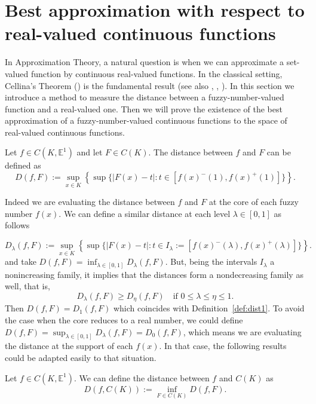 \documentclass[12pt]{amsart}
\begin{document}
\section{Best approximation with respect to real-valued continuous functions}

In Approximation Theory, a natural question is when we can approximate a set-valued function by continuous real-valued functions. In the classical setting, Cellina's Theorem (\cite{cellina}) is the fundamental result (see also \cite{Beer}, \cite{blasi}, \cite{hola}).  In this section we introduce a method to measure the distance between a fuzzy-number-valued function and a real-valued one. Then we will prove the existence of the best approximation of a fuzzy-number-valued continuous functions to the space of real-valued continuous functions.

\begin{definition}\label{def:dist1}
Let $f \in C(K,\mathbb{E}^1)$ and let $F\in C(K)$. The distance between $f$ and $F$ can be defined as
\[D(f,F):=\sup_{x\in K}\left\{\sup\{|F(x)-t|:t\in [f(x)^-(1),f(x)^+(1)]\}\right\}.\]
\end{definition}

\begin{remark}
Indeed we are evaluating the distance between $f$ and $F$ at the core of each fuzzy number $f(x)$. We can define a similar distance at each level $\lambda\in[0,1]$ as follows

\[
D_{\lambda}(f,F):=\sup_{x\in K}\left\{\sup\{|F(x)-t|:t\in I_{\lambda}:=[f(x)^-(\lambda),f(x)^+(\lambda)]\}\right\}.
\]
and take $D(f,F)=\inf_{\lambda\in[0,1]}D_{\lambda}(f,F)$.
But, being the intervals $I_\lambda$ a nonincreasing family, it implies that the distances form a nondecreasing family as well, that is,
\[
D_{\lambda}(f,F)\geq D_{\eta}(f,F) \quad \text{if $0\leq\lambda\leq \eta\leq 1$}.
\]
Then $D(f,F)=D_{1}(f,F)$ which coincides with Definition~\ref{def:dist1}.
To avoid the case when the core reduces to a real number, we could define
$D(f,F)=\sup_{\lambda\in[0,1]}D_{\lambda}(f,F)=D_{0}(f,F)$, which means we are evaluating the distance at the support of each $f(x)$.
In that case, the following results could be  adapted easily to that situation.
\end{remark}



\begin{definition}
Let $f \in C(K,\mathbb{E}^1)$. We can define the distance between $f$ and $C(K)$ as
\[D(f,C(K)):=\inf_{F\in C(K)} D(f,F).\]
\end{definition}
\end{document}
